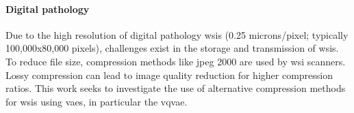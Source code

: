 \documentclass[review]{elsarticle}
\begin{document}
\paragraph{Digital pathology}
Due to the high resolution of digital pathology \glspl{wsi} (0.25 microns/pixel; typically 100,000x80,000 pixels), challenges exist in the storage and transmission of \glspl{wsi}. To reduce file size, compression methods like \gls{jpeg} 2000 are used by \gls{wsi} scanners. Lossy compression can lead to image quality reduction for higher compression ratios. This work seeks to investigate the use of alternative compression methods for \glspl{wsi} using \glspl{vae}, in particular the \gls{vqvae}.

\end{document}
